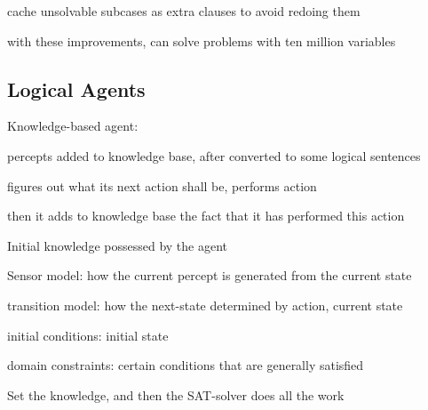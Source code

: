 \documentclass[12pt]{article}
\begin{document}
cache unsolvable subcases as extra clauses to avoid redoing them

with these improvements, can solve problems with ten million variables

\subsection{Logical Agents}

\noindent
Knowledge-based agent:

percepts added to knowledge base, after converted to some logical sentences

figures out what its next action shall be, performs action

then it adds to knowledge base the fact that it has performed this action

\noindent
Initial knowledge possessed by the agent

Sensor model: how the current percept is generated from the current state

transition model: how the next-state determined by action, current state

initial conditions: initial state

domain constraints: certain conditions that are generally satisfied

\noindent
Set the knowledge, and then the SAT-solver does all the work
\end{document}
